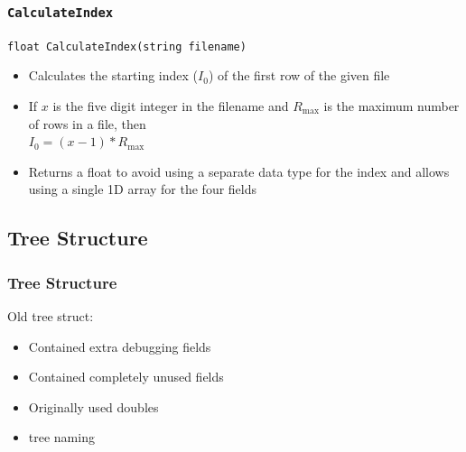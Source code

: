 \documentclass[usernames,dvipsnames]{beamer}
\begin{document}

\begin{frame}
	\frametitle{\texttt{CalculateIndex}}
	
	\begin{block}{\texttt{float CalculateIndex(string filename)}}
    		    \begin{itemize}
    		        \item Calculates the starting index ($I_0$) of the first row of the given file
    		        \item If $x$ is the five digit integer in the filename and $R_{\max}$ is the maximum number of rows in a file, then \\ 
    		        $I_0 = (x - 1) * R_{\max}$
                    \item Returns a float to avoid using a separate data type for the index and allows using a single 1D array for the four fields
    		    \end{itemize}
	\end{block}
\end{frame}

%
%

\subsection{Tree Structure}


\begin{frame}[fragile]
	\frametitle{Tree Structure}
	
    	\begin{block}{Old tree struct:}
    		\begin{itemize}
    			\item Contained extra debugging fields
    			\item Contained completely unused fields
    			\item Originally used doubles
    			\item tree naming
    		\end{itemize}
    	\end{block}
\end{frame}

\end{document}
